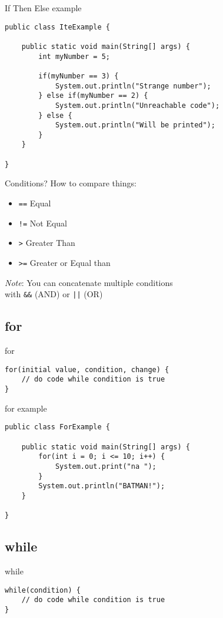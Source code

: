 \begin{frame}[fragile]{{\huge I}f {\huge T}hen {\huge E}lse example}
\begin{lstlisting}
public class IteExample {

	public static void main(String[] args) {
		int myNumber = 5;
		
		if(myNumber == 3) {
			System.out.println("Strange number");
		} else if(myNumber == 2) {
			System.out.println("Unreachable code");
		} else {
			System.out.println("Will be printed");
		}
	}
    
}
\end{lstlisting}
\end{frame}

\begin{frame}{Conditions?}
How to compare things:
\begin{itemize}
    \item \texttt{==} Equal
    \item \texttt{!=} Not Equal
    \item \texttt{>} Greater Than
    \item \texttt{>=} Greater or Equal than
\end{itemize}
\textit{Note}: You can concatenate multiple conditions\\ with \texttt{\&\&} (AND) or \texttt{||} (OR)
\end{frame}

\subsection{for}
\begin{frame}[fragile]{for}
\begin{lstlisting}
for(initial value, condition, change) {
	// do code while condition is true
}
\end{lstlisting}
\end{frame}

\begin{frame}[fragile]{for example}
\begin{lstlisting}
public class ForExample {

	public static void main(String[] args) {
		for(int i = 0; i <= 10; i++) {
			System.out.print("na ");
		}
		System.out.println("BATMAN!");
	}
    
}
\end{lstlisting}
\end{frame}

\subsection{while}
\begin{frame}[fragile]{while}
\begin{lstlisting}
while(condition) {
	// do code while condition is true
}
\end{lstlisting}
\end{frame}

